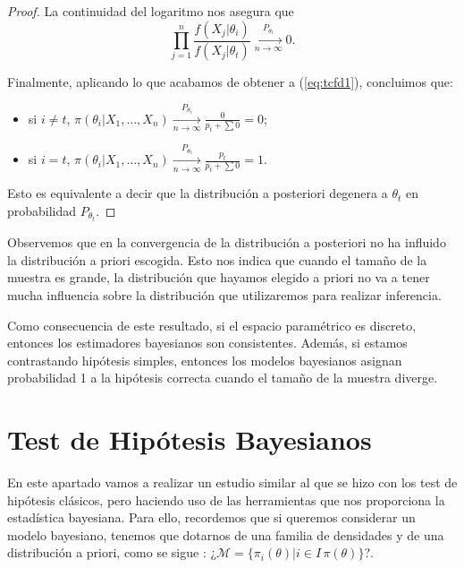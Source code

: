 \begin{proof}
	La continuidad del logaritmo nos asegura que
    \[\prod_{j=1}^n{\frac{f(X_j|\theta_i)}{f(X_j|\theta_t)}} \xrightarrow[n\to\infty]{P_{\theta_t}} 0.\]

	Finalmente, aplicando lo que acabamos de obtener a (\ref{eq:tcfd1}), concluimos que:

	\begin{itemize}
		\item si $i \ne t$, $\pi(\theta_i|X_1,\ldots,X_n) \xrightarrow[n\to\infty]{P_{\theta_t}} \frac{0}{p_t+\sum{0}} = 0$;
		\item si $i = t$, $\pi(\theta_i|X_1,\ldots,X_n) \xrightarrow[n\to\infty]{P_{\theta_t}} \frac{p_t}{p_t+\sum{0}} = 1$.
	\end{itemize}

	Esto es equivalente a decir que la distribución a posteriori degenera a $\theta_t$ en probabilidad $P_{\theta_t}$.
\end{proof}

\begin{remark}
	Observemos que en la convergencia de la distribución a posteriori no ha influido la distribución a priori escogida. Esto nos indica que cuando el tamaño de la muestra es grande, la distribución que hayamos elegido a priori no va a tener mucha influencia sobre la distribución que utilizaremos para realizar inferencia.
\end{remark}

\begin{remark}
    Como consecuencia de este resultado, si el espacio paramétrico es discreto, entonces los estimadores bayesianos son consistentes. Además, si estamos contrastando hipótesis simples, entonces los modelos bayesianos asignan probabilidad 1 a la hipótesis correcta cuando el tamaño de la muestra diverge.
\end{remark}

\pagebreak

\section{Test de Hipótesis Bayesianos} \label{sec:bayes:hipotesis}

En este apartado vamos a realizar un estudio similar al que se hizo con los test de hipótesis clásicos, pero haciendo uso de las herramientas que nos proporciona la estadística bayesiana. Para ello, recordemos que si queremos considerar un modelo bayesiano, tenemos que dotarnos de una familia de densidades y de una distribución a priori, como se sigue : ¿$\mathcal{M} = \{\pi_i(\theta)|i\in I\, \pi(\theta)\}$?.

